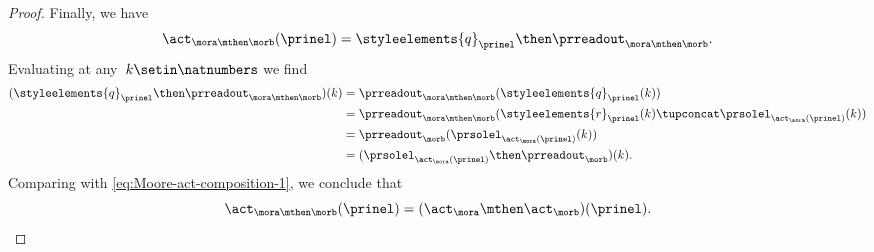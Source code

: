 \begin{proof}
        Finally, we have
        \begin{equation}
            \act_{\mora \mthen \morb}(\prinel) = \styleelements{q}_\prinel \then \prreadout_{\mora \mthen \morb}.
        \end{equation}
        Evaluating at any~$k \setin \natnumbers$ we find
    \begin{align*}
        (\styleelements{q}_\prinel \then \prreadout_{\mora \mthen \morb})(k)
         & = \prreadout_{\mora \mthen \morb}(\styleelements{q}_\prinel(k)) \\
         & = \prreadout_{\mora \mthen \morb}(\styleelements{r}_\prinel(k) \tupconcat \prsolel_{\act_\mora(\prinel)}(k)) \\
         & = \prreadout_{\morb}(\prsolel_{\act_\mora(\prinel)}(k)) \\
         & = (\prsolel_{\act_\mora(\prinel)} \then \prreadout_{\morb})(k).
    \end{align*}
    Comparing with \cref{eq:Moore-act-composition-1}, we conclude that
    \begin{equation}
        \act_{\mora \mthen \morb}(\prinel) = (\act_\mora \mthen \act_\morb)(\prinel).
    \end{equation}
\end{proof}


